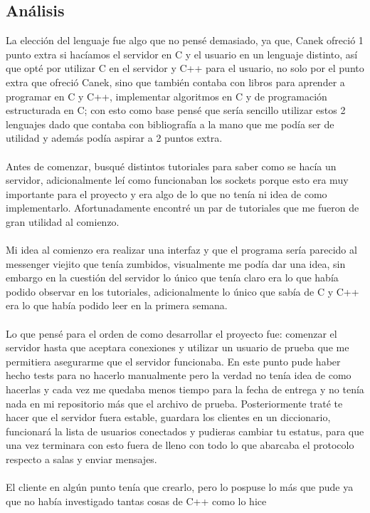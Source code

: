 \documentclass[12pt,a4paper]{article}
\begin{document}
\subsection{Análisis}
La elección del lenguaje fue algo que no pensé demasiado, ya que, Canek ofreció 1 punto extra si hacíamos el servidor en C y el usuario 
en un lenguaje distinto, así que opté por utilizar C en el servidor y C++ para el usuario, no solo por el punto extra que ofreció Canek, 
sino que también contaba con libros para aprender a programar en C y C++, implementar algoritmos en C y de programación estructurada en C; 
con esto como base pensé que sería sencillo utilizar estos 2 lenguajes dado que contaba con bibliografía a la mano que me podía ser de 
utilidad y además podía aspirar a 2 puntos extra.
\\\\
Antes de comenzar, busqué distintos tutoriales para saber como se hacía un servidor, adicionalmente leí como funcionaban los sockets 
porque esto era muy importante para el proyecto y era algo de lo que no tenía ni idea de como implementarlo. Afortunadamente encontré un par de tutoriales que me fueron de gran utilidad al comienzo.\\
\\
Mi idea al comienzo era realizar una interfaz y que el programa sería parecido al messenger viejito que tenía zumbidos, visualmente 
me podía dar una idea, sin embargo en la cuestión del servidor lo único que tenía claro era lo que había podido observar en los tutoriales,
 adicionalmente lo único que sabía de C y C++ era lo que había podido leer en la primera semana.
\\\\
Lo que pensé para el orden de como desarrollar el proyecto fue: comenzar el servidor hasta que aceptara conexiones y utilizar un usuario
de prueba que me permitiera asegurarme que el servidor funcionaba. En este punto pude haber hecho tests para no hacerlo manualmente pero 
la verdad no tenía idea de como hacerlas y cada vez me quedaba menos tiempo para la fecha de entrega y no tenía nada en mi repositorio más que el archivo de prueba. Posteriormente traté te hacer que el servidor fuera estable, guardara los clientes en un diccionario, funcionará la lista de usuarios conectados y pudieras cambiar tu estatus, para que una vez terminara con esto fuera de lleno con todo lo que abarcaba el protocolo respecto a salas y enviar mensajes.\\\\
El cliente en algún punto tenía que crearlo, pero lo pospuse lo más que pude ya que no había investigado tantas cosas de C++ como lo hice 
\end{document}
